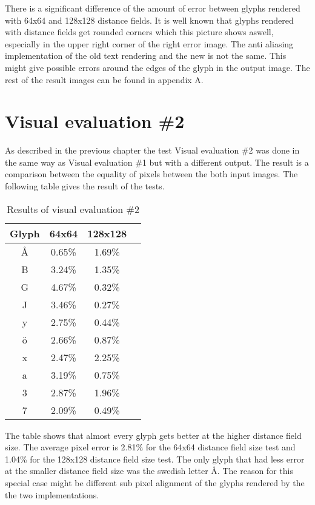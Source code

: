 There is a significant difference of the amount of error between glyphs rendered with 64x64 and 128x128 distance fields. It is well known that glyphs rendered with distance fields get rounded corners which this picture shows aswell, especially in the upper right corner of the right error image. The anti aliasing implementation of the old text rendering and the new is not the same. This might give possible errors around the edges of the glyph in the output image. The rest of the result images can be found in appendix A. 

\section{Visual evaluation \#2}
As described in the previous chapter the test Visual evaluation \#2 was done in the same way as Visual evaluation \#1 but with a different output. The result is a comparison between the equality of pixels between the both input images. The following table gives the result of the tests. 
\begin{table}[H]
\caption{Results of visual evaluation \#2}
\centering
\begin{tabular}{c c c c}
\hline
\hline %
Glyph & 64x64 & 128x128\\ [0.5ex] %
\hline
Å & 0.65\% & 1.69\% \\
B & 3.24\% & 1.35\% \\
G & 4.67\% & 0.32\% \\
J & 3.46\% & 0.27\% \\
y & 2.75\% & 0.44\% \\ 
ö & 2.66\% & 0.87\% \\
x & 2.47\% & 2.25\% \\
a & 3.19\% & 0.75\% \\
3 & 2.87\% & 1.96\% \\
7 & 2.09\% & 0.49\% \\ [1ex]
\hline
\end{tabular}
\label{table:nonlin}
\end{table}

The table shows that almost every glyph gets better at the higher distance field size. The average pixel error is 2.81\% for the 64x64 distance field size test and 1.04\% for the 128x128 distance field size test. The only glyph that had less error at the smaller distance field size was the swedish letter Å. The reason for this special case might be different sub pixel alignment of the glyphs rendered by the the two implementations.
